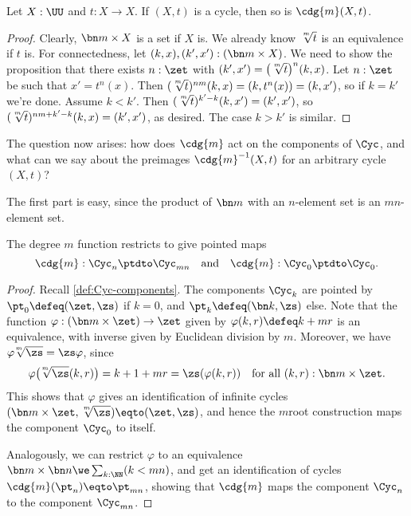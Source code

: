\begin{lemma} Let $X:\UU$ and $t:X\to X$.
  If $(X,t)$ is a cycle, then so is $\cdg{m}(X,t)$.
\end{lemma}
\begin{proof}
  Clearly, $\bn m\times X$ is a \nonempty set if $X$ is.
  We already know $\sqrt[\uproot{2}m]{t}$ is an equivalence if $t$ is.
  For connectedness, let $(k,x),(k',x'): (\bn m\times X)$.
  We need to show the proposition that there exists $n:\zet$
  with $(k',x') = \bigl(\sqrt[\uproot{2}m]t\bigr)^n(k,x)$.
  Let $n:\zet$ be such that $x' = t^n(x)$.
  Then $(\sqrt[\uproot{2}m]t)^{nm}(k,x) = (k,t^n(x)) = (k,x')$,
  so if $k=k'$ we're done.
  Assume $k<k'$. Then $(\sqrt[\uproot{2}m]t)^{k'-k}(k,x') = (k',x')$,
  so $(\sqrt[\uproot{2}m]t)^{nm+k'-k}(k,x) = (k',x')$, as desired.
  The case $k>k'$ is similar.
\end{proof}

The question now arises: how does $\cdg{m}$ act on the components of $\Cyc$,
and what can we say about the preimages $\cdg{m}^{-1}(X,t)$
for an arbitrary cycle $(X,t)$?

The first part is easy, since the product of $\bn m$ with an $n$-element set
is an $mn$-element set.
\begin{lemma} \label{lem:deg-m-on-Cyc}
  The degree $m$ function restricts to give pointed maps
  \[
    \cdg{m} : \Cyc_n \ptdto \Cyc_{mn} \quad\text{and}\quad
    \cdg{m} : \Cyc_0 \ptdto \Cyc_0.
  \]
\end{lemma}
\begin{proof}
  Recall \cref{def:Cyc-components}. The components $\Cyc_k$ are pointed
  by $\pt_0\defeq(\zet,\zs)$ if $k=0$, and $\pt_k\defeq(\bn k,\zs)$ else.  
  Note
  that the function $\varphi : (\bn m\times \zet) \to \zet$
  given by $\varphi(k,r) \defeq k+mr$ is an equivalence,
  with inverse given by Euclidean division by $m$.
  Moreover, we have ${\varphi\!\sqrt[\uproot{2}m]\zs} = {\zs\varphi}$, since
  \[
    \varphi\bigl(\!\sqrt[\uproot{2}m]\zs(k,r)\bigr)
    = k+1+mr = \zs(\varphi(k,r))
    \quad\text{for all $(k,r):\bn m\times \zet$}.
  \]
  This shows that $\varphi$ gives an identification of infinite cycles
  $(\bn m\times\zet, \sqrt[\uproot{2}m]\zs) \eqto (\zet,\zs)$,
  and hence the $m$\th root construction maps the component $\Cyc_0$ to itself.

  Analogously, we can restrict $\varphi$ to
  an equivalence $\bn m \times \bn n \we \sum_{k:\NN}(k<mn)$,
  and get an identification of cycles $\cdg{m}(\pt_n) \eqto \pt_{mn}$,
  showing that $\cdg{m}$ maps the component $\Cyc_n$ to the component $\Cyc_{mn}$.
\end{proof}

